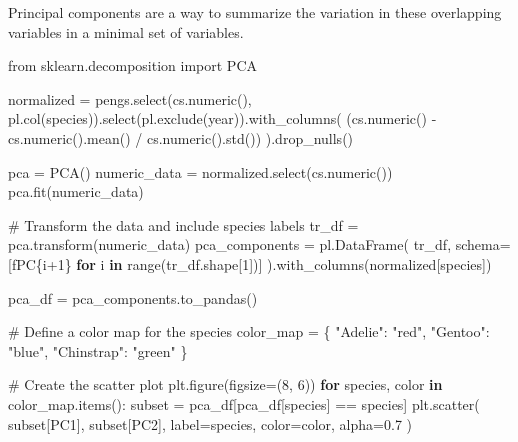 \documentclass[
  letterpaper,
  DIV=11,
  numbers=noendperiod]{scrreprt}
\newenvironment{Shaded}{\begin{snugshade}}{\end{snugshade}}
\newcommand{\BuiltInTok}[1]{\textcolor[rgb]{0.00,0.23,0.31}{#1}}
\newcommand{\CommentTok}[1]{\textcolor[rgb]{0.37,0.37,0.37}{#1}}
\newcommand{\ControlFlowTok}[1]{\textcolor[rgb]{0.00,0.23,0.31}{\textbf{#1}}}
\newcommand{\DecValTok}[1]{\textcolor[rgb]{0.68,0.00,0.00}{#1}}
\newcommand{\FloatTok}[1]{\textcolor[rgb]{0.68,0.00,0.00}{#1}}
\newcommand{\ImportTok}[1]{\textcolor[rgb]{0.00,0.46,0.62}{#1}}
\newcommand{\KeywordTok}[1]{\textcolor[rgb]{0.00,0.23,0.31}{\textbf{#1}}}
\newcommand{\NormalTok}[1]{\textcolor[rgb]{0.00,0.23,0.31}{#1}}
\newcommand{\OperatorTok}[1]{\textcolor[rgb]{0.37,0.37,0.37}{#1}}
\newcommand{\SpecialCharTok}[1]{\textcolor[rgb]{0.37,0.37,0.37}{#1}}
\newcommand{\SpecialStringTok}[1]{\textcolor[rgb]{0.13,0.47,0.30}{#1}}
\newcommand{\StringTok}[1]{\textcolor[rgb]{0.13,0.47,0.30}{#1}}
\begin{document}
Principal components are a way to summarize the variation in these
overlapping variables in a minimal set of variables.

\begin{Shaded}
\begin{Highlighting}[]
\ImportTok{from}\NormalTok{ sklearn.decomposition }\ImportTok{import}\NormalTok{ PCA}

\NormalTok{normalized }\OperatorTok{=}\NormalTok{ pengs.select(cs.numeric(), pl.col(}\StringTok{\textquotesingle{}species\textquotesingle{}}\NormalTok{)).select(pl.exclude(}\StringTok{\textquotesingle{}year\textquotesingle{}}\NormalTok{)).with\_columns(}
\NormalTok{        (cs.numeric() }\OperatorTok{{-}}\NormalTok{ cs.numeric().mean() }\OperatorTok{/}\NormalTok{ cs.numeric().std())}
\NormalTok{    ).drop\_nulls()}

\NormalTok{pca }\OperatorTok{=}\NormalTok{ PCA()}
\NormalTok{numeric\_data }\OperatorTok{=}\NormalTok{ normalized.select(cs.numeric())}
\NormalTok{pca.fit(numeric\_data)}

\CommentTok{\# Transform the data and include species labels}
\NormalTok{tr\_df }\OperatorTok{=}\NormalTok{ pca.transform(numeric\_data)}
\NormalTok{pca\_components }\OperatorTok{=}\NormalTok{ pl.DataFrame(}
\NormalTok{    tr\_df,}
\NormalTok{    schema}\OperatorTok{=}\NormalTok{[}\SpecialStringTok{f\textquotesingle{}PC}\SpecialCharTok{\{}\NormalTok{i}\OperatorTok{+}\DecValTok{1}\SpecialCharTok{\}}\SpecialStringTok{\textquotesingle{}} \ControlFlowTok{for}\NormalTok{ i }\KeywordTok{in} \BuiltInTok{range}\NormalTok{(tr\_df.shape[}\DecValTok{1}\NormalTok{])]}
\NormalTok{).with\_columns(normalized[}\StringTok{\textquotesingle{}species\textquotesingle{}}\NormalTok{]) }

\NormalTok{pca\_df }\OperatorTok{=}\NormalTok{ pca\_components.to\_pandas()}

\CommentTok{\# Define a color map for the species}
\NormalTok{color\_map }\OperatorTok{=}\NormalTok{ \{}
    \StringTok{"Adelie"}\NormalTok{: }\StringTok{"red"}\NormalTok{,}
    \StringTok{"Gentoo"}\NormalTok{: }\StringTok{"blue"}\NormalTok{,}
    \StringTok{"Chinstrap"}\NormalTok{: }\StringTok{"green"}
\NormalTok{\}}

\CommentTok{\# Create the scatter plot}
\NormalTok{plt.figure(figsize}\OperatorTok{=}\NormalTok{(}\DecValTok{8}\NormalTok{, }\DecValTok{6}\NormalTok{))}
\ControlFlowTok{for}\NormalTok{ species, color }\KeywordTok{in}\NormalTok{ color\_map.items():}
\NormalTok{    subset }\OperatorTok{=}\NormalTok{ pca\_df[pca\_df[}\StringTok{\textquotesingle{}species\textquotesingle{}}\NormalTok{] }\OperatorTok{==}\NormalTok{ species]}
\NormalTok{    plt.scatter(}
\NormalTok{        subset[}\StringTok{\textquotesingle{}PC1\textquotesingle{}}\NormalTok{], }
\NormalTok{        subset[}\StringTok{\textquotesingle{}PC2\textquotesingle{}}\NormalTok{], }
\NormalTok{        label}\OperatorTok{=}\NormalTok{species, }
\NormalTok{        color}\OperatorTok{=}\NormalTok{color, }
\NormalTok{        alpha}\OperatorTok{=}\FloatTok{0.7}
\NormalTok{    )}


\end{Highlighting}
\end{Shaded}
\end{document}
